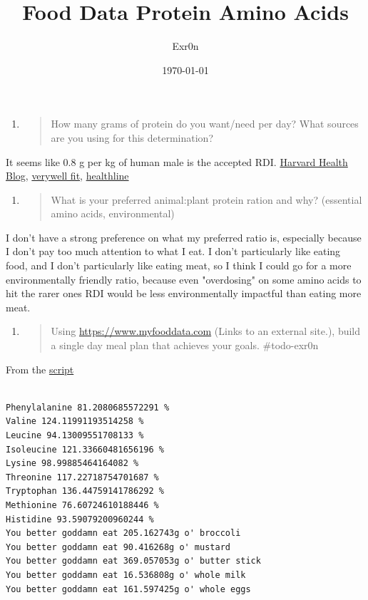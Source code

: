 \documentclass[letterpaper]{article}
\author{Exr0n}
\date{\today}
\title{Food Data Protein Amino Acids}
\renewcommand\maketitle{}
\begin{document}
\maketitle
\begin{enumerate}
\item \begin{quote}
How many grams of protein do you want/need per day? What sources
are you using for this determination?
\end{quote}
\end{enumerate}

It seems like 0.8 g per kg of human male is the accepted RDI.
\href{https://www.health.harvard.edu/blog/how-much-protein-do-you-need-every-day-201506188096}{Harvard
Health Blog},
\href{https://www.verywellfit.com/how-to-calculate-how-much-protein-you-need-3955709}{verywell
fit},
\href{https://www.healthline.com/nutrition/how-much-protein-per-day}{healthline}

\begin{enumerate}
\item \begin{quote}
What is your preferred animal:plant protein ration and why?
(essential amino acids, environmental)
\end{quote}
\end{enumerate}

I don't have a strong preference on what my preferred ratio is,
especially because I don't pay too much attention to what I eat. I don't
particularly like eating food, and I don't particularly like eating
meat, so I think I could go for a more environmentally friendly ratio,
because even "overdosing" on some amino acids to hit the rarer ones RDI
would be less environmentally impactful than eating more meat.

\begin{enumerate}
\item \begin{quote}
Using \url{https://www.myfooddata.com} (Links to an external site.),
build a single day meal plan that achieves your goals. \#todo-exr0n
\end{quote}
\end{enumerate}

From the
\href{https://github.com/SkoolNotes/diet-finder8000superplus}{script}

\begin{verbatim}

Phenylalanine 81.2080685572291 %
Valine 124.11991193514258 %
Leucine 94.13009551708133 %
Isoleucine 121.33660481656196 %
Lysine 98.99885464164082 %
Threonine 117.22718754701687 %
Tryptophan 136.44759141786292 %
Methionine 76.60724610188446 %
Histidine 93.59079200960244 %
You better goddamn eat 205.162743g o' broccoli
You better goddamn eat 90.416268g o' mustard
You better goddamn eat 369.057053g o' butter stick
You better goddamn eat 16.536808g o' whole milk
You better goddamn eat 161.597425g o' whole eggs
\end{verbatim}
\end{document}
